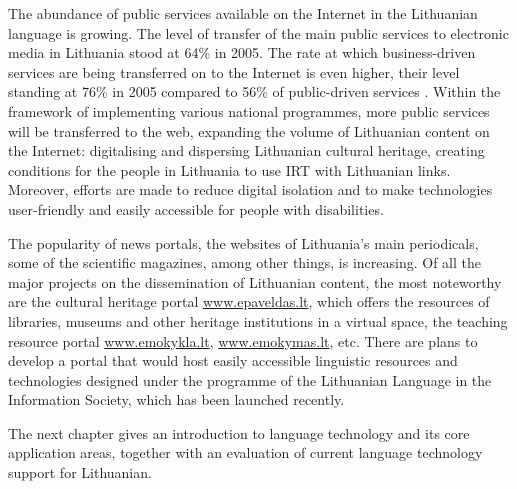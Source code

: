 \begin{multicols}{2}

The abundance of public services available on the Internet in the Lithuanian language is growing. The level of transfer of the main public services to electronic media in Lithuania stood at 64\% in 2005. The rate at which business-driven services are being transferred on to the Internet is even higher, their level standing at 76\% in 2005 compared to 56\% of public-driven services \cite{esparama}.  Within the framework of implementing various national programmes, more public services will be transferred to the web, expanding the volume of Lithuanian content on the Internet: digitalising and dispersing Lithuanian cultural heritage, creating conditions for the people in Lithuania to use IRT with Lithuanian links. Moreover, efforts are made to reduce digital isolation and to make technologies user-friendly and easily accessible for people with disabilities. 

The popularity of news portals, the websites of Lithuania’s main periodicals, some of the scientific magazines, among other things, is increasing. Of all the major projects on the dissemination of Lithuanian content, the most noteworthy are the cultural heritage portal \url{www.epaveldas.lt}, which offers the resources of libraries, museums and other heritage institutions in a virtual space, the teaching resource portal \url{www.emokykla.lt}, \url{www.emokymas.lt}, etc. There are plans to develop a portal that would host easily accessible linguistic resources and technologies designed under the programme of the Lithuanian Language in the Information Society, which has been launched recently.


    The next chapter gives an introduction to language technology and its core application areas, together with an evaluation of current language technology support for Lithuanian.
\end{multicols}

\clearpage


